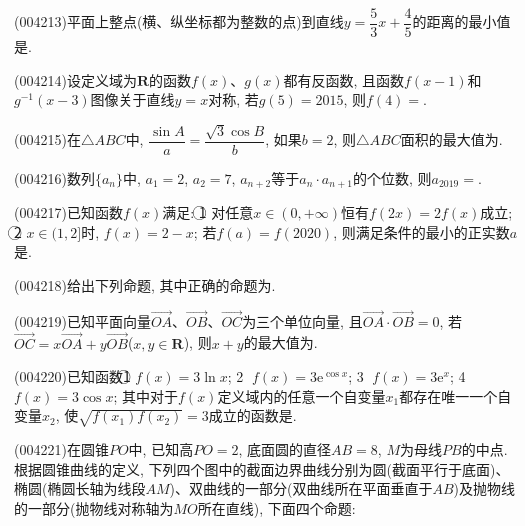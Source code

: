 \begin{center}
\end{center}
\item (004213)平面上整点(横、纵坐标都为整数的点)到直线$y=\dfrac 53x+\dfrac 45$的距离的最小值是.
\item (004214)设定义域为$\mathbf{R}$的函数$f(x)$、$g(x)$都有反函数, 且函数$f(x-1)$和$g^{-1}(x-3)$图像关于直线$y=x$对称, 若$g(5)=2015$, 则$f(4)=$.
\item (004215)在$\triangle ABC$中, $\dfrac{\sin A}a=\dfrac{\sqrt 3\cos B}b$, 如果$b=2$, 则$\triangle ABC$面积的最大值为.
\item (004216)数列$\{a_n\}$中, $a_1=2$, $a_2=7$, $a_{n+2}$等于$a_n\cdot a_{n+1}$的个位数, 则$a_{2019}=$.
\item (004217)已知函数$f(x)$满足: \textcircled{1} 对任意$x\in (0,+\infty)$恒有$f(2x)=2f(x)$成立; \textcircled{2} $x\in (1,2]$时, $f(x)=2-x$; 若$f(a)=f(2020)$, 则满足条件的最小的正实数$a$是.
\item (004218)给出下列命题, 其中正确的命题为.
\item (004219)已知平面向量$\overrightarrow{OA}$、$\overrightarrow{OB}$、$\overrightarrow{OC}$为三个单位向量, 且$\overrightarrow{OA}\cdot \overrightarrow{OB}=0$, 若$\overrightarrow{OC}=x\overrightarrow{OA}+y\overrightarrow{OB}$($x,y\in \mathbf{R}$), 则$x+y$的最大值为.
\item (004220)已知函数\textcircled{1} $f(x)=3\ln x$; \textcircled{2} $f(x)=3\mathrm{e}^{\cos x}$; \textcircled{3} $f(x)=3\mathrm{e}^x$; \textcircled{4} $f(x)=3\cos x$; 其中对于$f(x)$定义域内的任意一个自变量$x_1$都存在唯一一个自变量$x_2$, 使$\sqrt{f(x_1)f(x_2)}=3$成立的函数是.
\item (004221)在圆锥$PO$中, 已知高$PO=2$, 底面圆的直径$AB=8$, $M$为母线$PB$的中点. 根据圆锥曲线的定义, 下列四个图中的截面边界曲线分别为圆(截面平行于底面)、椭圆(椭圆长轴为线段$AM$)、双曲线的一部分(双曲线所在平面垂直于$AB$)及抛物线的一部分(抛物线对称轴为$MO$所在直线), 下面四个命题:\\
